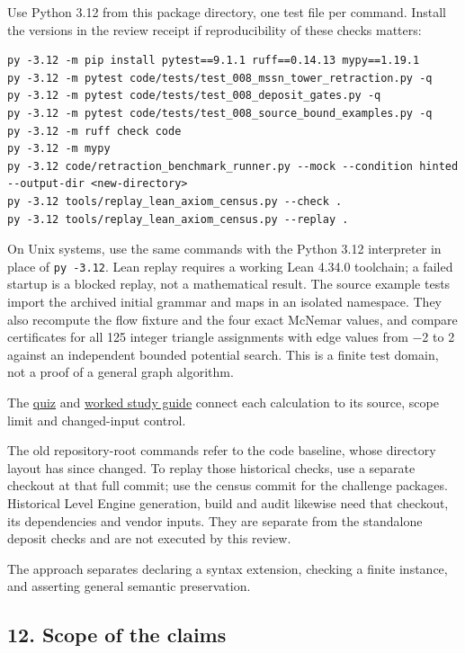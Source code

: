 \documentclass[
  11pt,
]{article}
\newcommand{\passthrough}[1]{#1}
\begin{document}
Use Python 3.12 from this package directory, one test file per command.
Install the versions in the review receipt if reproducibility of these
checks matters:

\begin{lstlisting}
py -3.12 -m pip install pytest==9.1.1 ruff==0.14.13 mypy==1.19.1
py -3.12 -m pytest code/tests/test_008_mssn_tower_retraction.py -q
py -3.12 -m pytest code/tests/test_008_deposit_gates.py -q
py -3.12 -m pytest code/tests/test_008_source_bound_examples.py -q
py -3.12 -m ruff check code
py -3.12 -m mypy
py -3.12 code/retraction_benchmark_runner.py --mock --condition hinted --output-dir <new-directory>
py -3.12 tools/replay_lean_axiom_census.py --check .
py -3.12 tools/replay_lean_axiom_census.py --replay .
\end{lstlisting}

On Unix systems, use the same commands with the Python 3.12 interpreter
in place of \passthrough{\lstinline!py -3.12!}. Lean replay requires a
working Lean 4.34.0 toolchain; a failed startup is a blocked replay, not
a mathematical result. The source example tests import the archived
initial grammar and maps in an isolated namespace. They also recompute
the flow fixture and the four exact McNemar values, and compare
certificates for all 125 integer triangle assignments with edge values
from −2 to 2 against an independent bounded potential search. This is a
finite test domain, not a proof of a general graph algorithm.

The
\href{../../008_pfp_mssn_tower_challenges_and_retraction_benchmarks/_lev_landau_theoretical_minimum_quiz/quiz.md}{quiz}
and
\href{../../008_pfp_mssn_tower_challenges_and_retraction_benchmarks/_lev_landau_theoretical_minimum_quiz/study_guide.md}{worked
study guide} connect each calculation to its source, scope limit and
changed-input control.

The old repository-root commands refer to the code baseline, whose
directory layout has since changed. To replay those historical checks,
use a separate checkout at that full commit; use the census commit for
the challenge packages. Historical Level Engine generation, build and
audit likewise need that checkout, its dependencies and vendor inputs.
They are separate from the standalone deposit checks and are not
executed by this review.

The approach separates declaring a syntax extension, checking a finite
instance, and asserting general semantic preservation.

\hypertarget{scope-of-the-claims}{%
\subsection{12. Scope of the claims}\label{scope-of-the-claims}}
\end{document}
